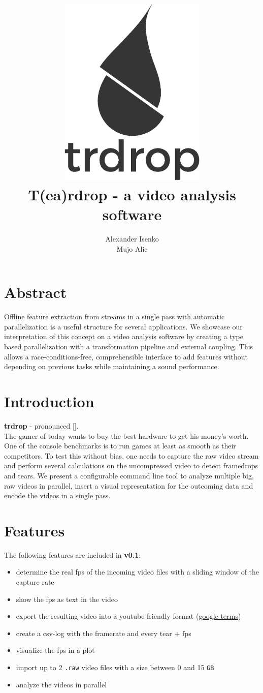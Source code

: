 \documentclass[titlepage]{article}
\title{\includegraphics[width=200pt, height=260pt]{../../images/trdrop_logo_text.eps} \\[50pt]
T(ea)rdrop - a video analysis software}
\author{Alexander Isenko\\Mujo Alic}
\date{}
\begin{document}
\maketitle

\newpage

\section{Abstract}
Offline feature extraction from streams in a single pass with automatic parallelization is a useful structure for several applications. We showcase our interpretation of this concept on a video analysis software by creating a type based parallelization with a transformation pipeline and external coupling. This allows a race-conditions-free, comprehensible interface to add features without depending on previous tasks while maintaining a sound performance.

\section{Introduction}

\textbf{trdrop} - pronounced [\textit{}]. \\[2mm]
\hfill
The gamer of today wants to buy the best hardware to get his money's worth. One of the console benchmarks is to run games at least as smooth as their competitors. To test this without bias, one needs to capture the raw video stream and perform several calculations on the uncompressed video to detect framedrops and tears. We present a configurable command line tool to analyze multiple big, raw videos in parallel, insert a visual representation for the outcoming data and encode the videos in a single pass. 

\section{Features}

The following features are included in \textbf{v0.1}:

\begin{itemize}
    \item determine the real fps of the incoming video files with a sliding window of the capture rate
    \item show the fps as text in the video
    \item export the resulting video into a youtube friendly format (\href{https://support.google.com/youtube/answer/1722171}{google-terms})
    \item create a csv-log with the framerate and every tear + fps
    \item visualize the fps in a plot
    \item import up to 2 \texttt{.raw} video files with a size between 0 and 15 \texttt{GB}
    \item analyze the videos in parallel
    
\end{itemize}
\end{document}
